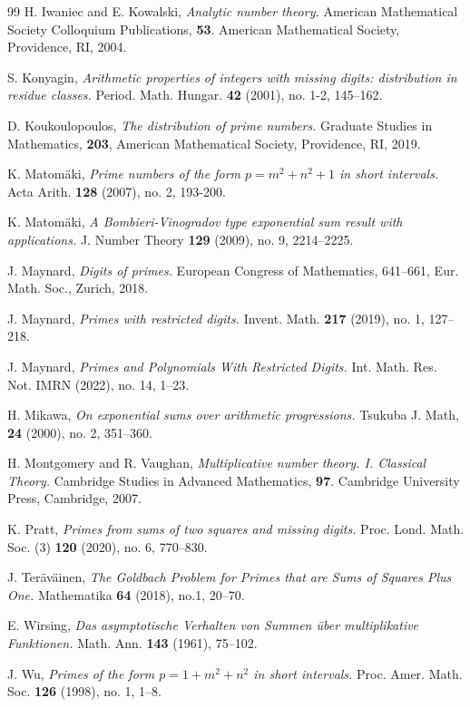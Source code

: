 \documentclass[12pt]{amsart}
\numberwithin{equation}{section}
\theoremstyle{remark}
\theoremstyle{definition}
\begin{document}
\begin{thebibliography}{99}
  H. Iwaniec and E. Kowalski, \emph{Analytic number theory.} American Mathematical Society Colloquium Publications, \textbf{53}. American Mathematical Society, Providence, RI, 2004.

 S. Konyagin, \emph{Arithmetic properties of integers with missing digits: distribution in residue
classes.} Period. Math. Hungar. \textbf{42} (2001), no. 1-2, 145--162. 

 D. Koukoulopoulos, \emph{The distribution of prime numbers.} Graduate Studies in Mathematics, \textbf{203}, American Mathematical Society, Providence, RI, 2019.



 K. Matom\"{a}ki, \emph{Prime numbers of the form $p=m^2+n^2+1$ in short intervals.} Acta Arith. \textbf{128} (2007), no. 2, 193-200.

 K. Matom\"{a}ki, \emph{A Bombieri-Vinogradov type exponential sum result with applications.} J. Number Theory \textbf{129} (2009), no. 9, 2214--2225.

 J. Maynard, \emph{Digits of primes.} European Congress of Mathematics, 641--661, Eur. Math. Soc., Zurich, 2018.

 J. Maynard, \emph{Primes with restricted digits.} Invent. Math. \textbf{217} (2019), no. 1, 127--218. 

 J. Maynard, \emph{Primes and Polynomials With Restricted Digits.} {Int. Math. Res. Not. IMRN} (2022), no. 14, 1--23.

 H. Mikawa, \emph{On exponential sums over arithmetic progressions.} Tsukuba J. Math, \textbf{24} (2000), no. 2, 351--360.


 H. Montgomery and R. Vaughan, \emph{Multiplicative number theory. I. Classical Theory.} Cambridge Studies in Advanced Mathematics, \textbf{97}. Cambridge University Press, Cambridge, 2007.




 K. Pratt, \emph{Primes from sums of two squares and missing digits.} Proc. Lond. Math. Soc. (3) \textbf{120} (2020), no. 6, 770--830.




 J. Ter\"{a}v\"{a}inen, \emph{The Goldbach Problem for Primes that are Sums of Squares Plus One.} Mathematika \textbf{64} (2018), no.1, 20--70.



 E. Wirsing, \emph{ Das asymptotische Verhalten von Summen \"{u}ber multiplikative Funktionen.} Math. Ann. \textbf{143} (1961), 75--102.

 J. Wu, \emph{Primes of the form $p=1+m^2+n^2$ in short intervals.} Proc. Amer. Math. Soc. \textbf{126} (1998), no. 1, 1--8.




\end{thebibliography}
\end{document}

